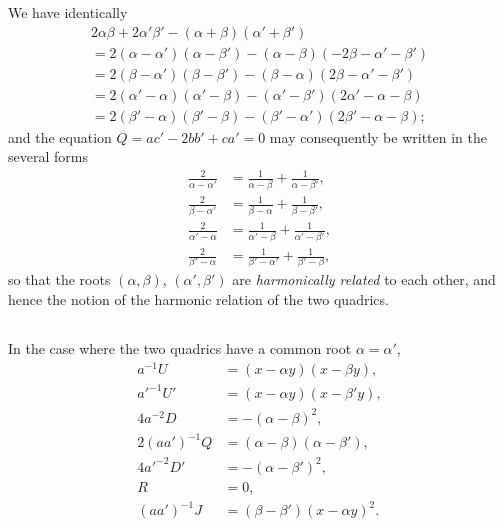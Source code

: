 \documentclass[11pt,a4paper]{book}
\begin{document}
\begin{center}
We have identically
\begin{align*}
2\alpha\beta + 2\alpha'\beta' - (\alpha + \beta)(\alpha' + \beta') \\
= 2(\alpha - \alpha')(\alpha - \beta') - (\alpha - \beta)(-2\beta - \alpha' - \beta') \\
= 2(\beta - \alpha')(\beta - \beta') - (\beta - \alpha)(2\beta - \alpha' - \beta') \\
= 2(\alpha' - \alpha)(\alpha' - \beta) - (\alpha' - \beta')(2\alpha' - \alpha - \beta) \\
= 2(\beta' - \alpha)(\beta' - \beta) - (\beta' - \alpha')(2\beta' - \alpha - \beta);
\end{align*}
and the equation $Q = ac' - 2bb' + ca' = 0$ may consequently be written in the several forms
\begin{align*}
\frac{2}{\alpha - \alpha'} &= \frac{1}{\alpha - \beta} + \frac{1}{\alpha - \beta'},\\
\frac{2}{\beta - \alpha'} &= \frac{1}{\beta - \alpha} + \frac{1}{\beta - \beta'},\\
\frac{2}{\alpha' - \alpha} &= \frac{1}{\alpha' - \beta} + \frac{1}{\alpha' - \beta'},\\
\frac{2}{\beta' - \alpha} &= \frac{1}{\beta' - \alpha'} + \frac{1}{\beta' - \beta},
\end{align*}
so that the roots $(\alpha, \beta)$, $(\alpha', \beta')$ are \textit{harmonically related} to each other, and hence the notion of the harmonic relation of the two quadrics.

\subsection{}

In the case where the two quadrics have a common root $\alpha = \alpha'$,
\begin{align*}
a^{-1}U &= (x - \alpha y)(x - \beta y),\\
a'^{-1}U' &= (x - \alpha y)(x - \beta' y),\\
4a^{-2}D &= -(\alpha - \beta)^2,\\
2(aa')^{-1}Q &= (\alpha - \beta)(\alpha - \beta'),\\
4a'^{-2}D' &= -(\alpha - \beta')^2,\\
R &= 0,\\
(aa')^{-1}J &= (\beta - \beta')(x - \alpha y)^2.
\end{align*}

\subsection{}


\end{center}
\end{document}

